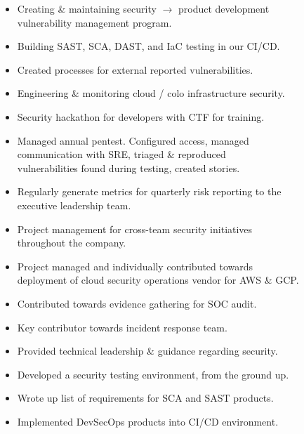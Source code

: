 \documentclass[10pt,a4paper,ragged2e]{rohrbach}
\begin{document}
\begin{paracol}{2}

\begin{itemize}
  \item Creating \& maintaining security $\rightarrow$ product development\\ vulnerability management program.
  \item Building SAST, SCA, DAST, and IaC testing in our CI/CD.
  \item Created processes for external reported vulnerabilities.
  \item Engineering \& monitoring cloud / colo infrastructure security.
  \item Security hackathon for developers with CTF for training.
  \item Managed annual pentest. Configured access, managed \\communication with SRE, triaged \& reproduced \\vulnerabilities found during testing, created stories.
  \item Regularly generate metrics for quarterly risk reporting to the \\executive leadership team.
  \item Project management for cross-team security initiatives\\ throughout the company. 
  \item Project managed and individually contributed towards\\ deployment of cloud security operations vendor for AWS \& GCP.
  \item Contributed towards evidence gathering for SOC audit.
  \item Key contributor towards incident response team.
  \item Provided technical leadership \& guidance regarding security.
\end{itemize}

\divider

\begin{itemize}
  \item Developed a security testing environment, from the ground up.
  \item Wrote up list of requirements for SCA and SAST products.
  \item Implemented DevSecOps products into CI/CD environment.
\end{itemize}


\end{paracol}
\end{document}
